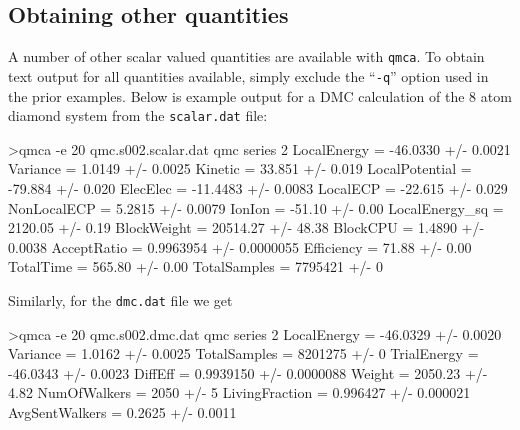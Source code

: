\subsection{Obtaining other quantities}
\label{sec:qmca_other_quantities}
A number of other scalar valued quantities are available with 
\texttt{qmca}.  To obtain text output for all quantities 
available, simply exclude the ``\texttt{-q}'' option used in 
the prior examples.  Below is example output for a DMC calculation 
of the 8 atom diamond system from the \texttt{scalar.dat} file:
\begin{shade}
>qmca -e 20 qmc.s002.scalar.dat 
qmc  series 2 
  LocalEnergy           =          -46.0330 +/-           0.0021 
  Variance              =            1.0149 +/-           0.0025 
  Kinetic               =            33.851 +/-            0.019 
  LocalPotential        =           -79.884 +/-            0.020 
  ElecElec              =          -11.4483 +/-           0.0083 
  LocalECP              =           -22.615 +/-            0.029 
  NonLocalECP           =            5.2815 +/-           0.0079 
  IonIon                =            -51.10 +/-             0.00 
  LocalEnergy_sq        =           2120.05 +/-             0.19 
  BlockWeight           =          20514.27 +/-            48.38 
  BlockCPU              =            1.4890 +/-           0.0038 
  AcceptRatio           =         0.9963954 +/-        0.0000055 
  Efficiency            =             71.88 +/-             0.00 
  TotalTime             =            565.80 +/-             0.00 
  TotalSamples          =           7795421 +/-                0 
\end{shade}
\noindent
Similarly, for the \texttt{dmc.dat} file we get
\begin{shade}
>qmca -e 20 qmc.s002.dmc.dat 
qmc  series 2 
  LocalEnergy           =          -46.0329 +/-           0.0020 
  Variance              =            1.0162 +/-           0.0025 
  TotalSamples          =           8201275 +/-                0 
  TrialEnergy           =          -46.0343 +/-           0.0023 
  DiffEff               =         0.9939150 +/-        0.0000088 
  Weight                =           2050.23 +/-             4.82 
  NumOfWalkers          =              2050 +/-                5 
  LivingFraction        =          0.996427 +/-         0.000021 
  AvgSentWalkers        =            0.2625 +/-           0.0011 
\end{shade}

